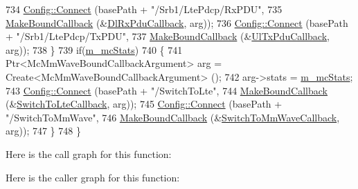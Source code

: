 \begin{DoxyCode}
734       \hyperlink{group__config_ga4014f151241cd0939b6cb64409605736}{Config::Connect} (basePath + \textcolor{stringliteral}{"/Srb1/LtePdcp/RxPDU"},
735                        \hyperlink{group__makeboundcallback_ga1725d6362e6065faa0709f7c93f8d770}{MakeBoundCallback} (&\hyperlink{namespacens3_ae4fb5123d8a56fce742428b530ec4197}{DlRxPduCallback}, arg));
736       \hyperlink{group__config_ga4014f151241cd0939b6cb64409605736}{Config::Connect} (basePath + \textcolor{stringliteral}{"/Srb1/LtePdcp/TxPDU"},
737                        \hyperlink{group__makeboundcallback_ga1725d6362e6065faa0709f7c93f8d770}{MakeBoundCallback} (&\hyperlink{namespacens3_ae624428f0992ac62a3c5f2e7318fb98e}{UlTxPduCallback}, arg));
738     \}
739   \textcolor{keywordflow}{if}(\hyperlink{classns3_1_1MmWaveBearerStatsConnector_a7c33409f7f21ab2d63c722886c1ab8bd}{m\_mcStats})
740     \{
741       Ptr<McMmWaveBoundCallbackArgument> arg = Create<McMmWaveBoundCallbackArgument> ();
742       arg->stats = \hyperlink{classns3_1_1MmWaveBearerStatsConnector_a7c33409f7f21ab2d63c722886c1ab8bd}{m\_mcStats};
743       \hyperlink{group__config_ga4014f151241cd0939b6cb64409605736}{Config::Connect} (basePath + \textcolor{stringliteral}{"/SwitchToLte"},
744             \hyperlink{group__makeboundcallback_ga1725d6362e6065faa0709f7c93f8d770}{MakeBoundCallback} (&\hyperlink{namespacens3_a333eb92711b0ee20ea21af119e8e4d36}{SwitchToLteCallback}, arg));
745       \hyperlink{group__config_ga4014f151241cd0939b6cb64409605736}{Config::Connect} (basePath + \textcolor{stringliteral}{"/SwitchToMmWave"},
746             \hyperlink{group__makeboundcallback_ga1725d6362e6065faa0709f7c93f8d770}{MakeBoundCallback} (&\hyperlink{namespacens3_a9aa3110f65206a13cd8df86331a59532}{SwitchToMmWaveCallback}, arg));
747     \}
748 \}
\end{DoxyCode}


Here is the call graph for this function\+:




Here is the caller graph for this function\+:


